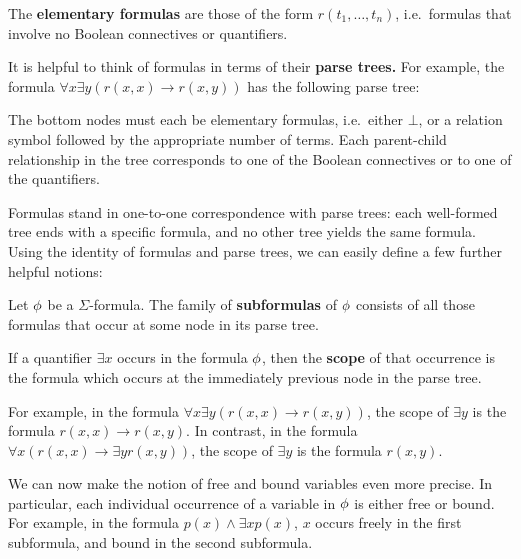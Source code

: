 \begin{defn} The \textbf{elementary formulas} are those of the form
  $r(t_1,\dots ,t_n)$, i.e.\ formulas that involve no Boolean
  connectives or quantifiers. \end{defn}

It is helpful to think of formulas in terms of their \textbf{parse
  trees.}  For example, the formula
$\forall x\exists y(r(x,x)\to r(x,y))$ has the following parse tree:

\bigskip {}

\noindent The bottom nodes must each be elementary formulas, i.e.\
either $\bot$, or a relation symbol followed by the appropriate number
of terms.  Each parent-child relationship in the tree corresponds to
one of the Boolean connectives or to one of the quantifiers.

Formulas stand in one-to-one correspondence with parse trees: each
well-formed tree ends with a specific formula, and no other tree
yields the same formula.  Using the identity of formulas and parse
trees, we can easily define a few further helpful notions:

\begin{defn} Let $\phi$ be a $\Sigma$-formula.  The family of
  \textbf{subformulas} of $\phi$ consists of all those formulas that
  occur at some node in its parse tree.  \end{defn}

\begin{defn} If a quantifier $\exists x$ occurs in the formula $\phi$,
  then the \textbf{scope} of that occurrence is the formula which
  occurs at the immediately previous node in the parse
  tree.  \end{defn}

For example, in the formula $\forall x\exists y(r(x,x)\to r(x,y))$,
the scope of $\exists y$ is the formula $r(x,x)\to r(x,y)$.  In
contrast, in the formula $\forall x(r(x,x)\to \exists yr(x,y))$, the
scope of $\exists y$ is the formula $r(x,y)$.

We can now make the notion of free and bound variables even more
precise.  In particular, each individual occurrence of a variable in
$\phi$ is either free or bound.  For example, in the formula
$p(x)\wedge \exists xp(x)$, $x$ occurs freely in the first subformula,
and bound in the second subformula.

